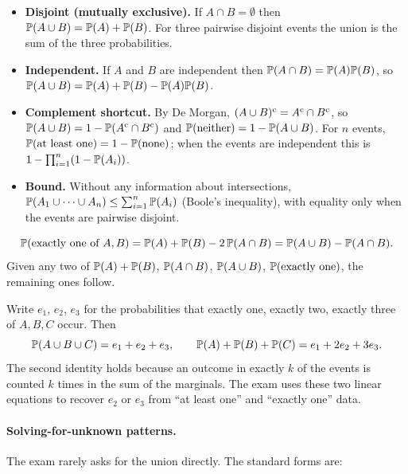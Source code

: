 \begin{itemize}[leftmargin=2em]
  \item \textbf{Disjoint (mutually exclusive).} If $A \cap B = \emptyset$ then
  $\mathbb{P}(A \cup B) = \mathbb{P}(A) + \mathbb{P}(B)$. For three pairwise disjoint events the union is the sum
  of the three probabilities.
  \item \textbf{Independent.} If $A$ and $B$ are independent then $\mathbb{P}(A \cap B) = \mathbb{P}(A)\mathbb{P}(B)$, so
  $\mathbb{P}(A \cup B) = \mathbb{P}(A) + \mathbb{P}(B) - \mathbb{P}(A)\mathbb{P}(B)$.
  \item \textbf{Complement shortcut.} By De Morgan, $(A \cup B)^{\mathrm{c}} = A^{\mathrm{c}} \cap B^{\mathrm{c}}$, so
  $\mathbb{P}(A \cup B) = 1 - \mathbb{P}(A^{\mathrm{c}} \cap B^{\mathrm{c}})$ and $\mathbb{P}(\text{neither}) = 1 - \mathbb{P}(A \cup B)$.
  For $n$ events, $\mathbb{P}(\text{at least one}) = 1 - \mathbb{P}(\text{none})$; when the events are
  independent this is $1 - \prod_{i=1}^{n}(1 - \mathbb{P}(A_i))$.
  \item \textbf{Bound.} Without any information about intersections,
  $\mathbb{P}(A_1 \cup \cdots \cup A_n) \le \sum_{i=1}^{n} \mathbb{P}(A_i)$ (Boole's inequality), with
  equality only when the events are pairwise disjoint.
\end{itemize}

\begin{keyfact}
\[
\mathbb{P}(\text{exactly one of } A, B) = \mathbb{P}(A) + \mathbb{P}(B) - 2\,\mathbb{P}(A \cap B)
 = \mathbb{P}(A \cup B) - \mathbb{P}(A \cap B).
\]
Given any two of $\mathbb{P}(A)+\mathbb{P}(B)$, $\mathbb{P}(A\cap B)$, $\mathbb{P}(A\cup B)$,
$\mathbb{P}(\text{exactly one})$, the remaining ones follow.
\end{keyfact}

\begin{keyfact}
Write $e_1$, $e_2$, $e_3$ for the probabilities that exactly one, exactly two, exactly three of
$A, B, C$ occur. Then
\[
\mathbb{P}(A \cup B \cup C) = e_1 + e_2 + e_3, \qquad
\mathbb{P}(A) + \mathbb{P}(B) + \mathbb{P}(C) = e_1 + 2e_2 + 3e_3.
\]
The second identity holds because an outcome in exactly $k$ of the events is counted $k$ times in
the sum of the marginals. The exam uses these two linear equations to recover $e_2$ or $e_3$ from
``at least one'' and ``exactly one'' data.
\end{keyfact}

\paragraph{Solving-for-unknown patterns.} The exam rarely asks for the union directly. The
standard forms are:

